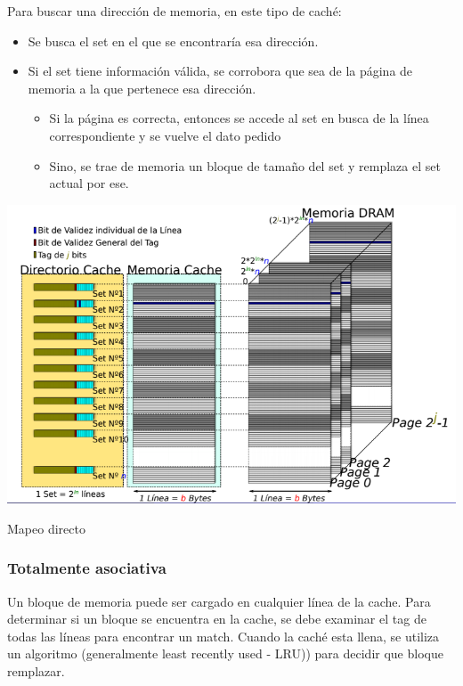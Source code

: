 Para  buscar una dirección de memoria, en este tipo de caché:

\begin{itemize}
	\item Se busca el set en el que se encontraría esa dirección.
	\item Si el set tiene información válida, se corrobora que sea de la página de memoria a la que pertenece esa dirección.
	\begin{itemize}
		\item Si la página es correcta, entonces se accede al set en busca de la línea correspondiente y se vuelve el dato pedido
		\item Sino, se trae de memoria un bloque de tamaño del set y remplaza el set actual por ese.
	\end{itemize}
\end{itemize}
\begin{minipage}{\textwidth}
	\centering
\includegraphics[width=\textwidth]{imagenes/cache-mapeo-directo}

Mapeo directo
	
\end{minipage}

\subsubsection{Totalmente asociativa}
Un bloque de memoria puede ser cargado en cualquier línea de la cache. Para determinar si un bloque se encuentra en la cache, se debe examinar el tag de todas las líneas para encontrar un match. Cuando la caché esta llena, se utiliza un algoritmo (generalmente least recently used - LRU)) para decidir que bloque remplazar.


